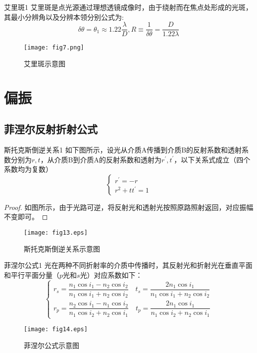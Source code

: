 \begin{myprop}{艾里斑}{1}
	艾里斑是点光源通过理想透镜成像时，由于绕射而在焦点处形成的光斑，其最小分辨角以及分辨本领分别公式为:
	\[
		\delta \theta=\theta_1 \approx 1.22 \frac{\lambda}{D},R \equiv \frac{1}{\delta \theta}=\frac{D}{1.22 \lambda}
	\]
\end{myprop}
\begin{figure}[!htp]
	\centering
	\texttt{[image: fig7.png]}
	\caption{艾里斑示意图}
\end{figure}








\section{偏振}

\subsection{菲涅尔反射折射公式}

\begin{myprop}{斯托克斯倒逆关系}{1}
如下图所示，设光从介质A传播到介质B的反射系数和透射系数分别为$r,t$，从介质B到介质A的反射系数和透射为$r^{\prime},t^{\prime}$，以下关系式成立（四个系数均为复数）
	\[
		\left\{\begin{array}{l}r^{\prime}=-r \\ r^2+t t^{\prime}=1\end{array}\right.
	\]
\end{myprop}
\begin{proof}
	如图所示，由于光路可逆，将反射光和透射光按照原路照射返回，对应振幅不变即可。
\end{proof}
\begin{figure}[!htp]
	\centering
	\texttt{[image: fig13.eps]}
	\caption{斯托克斯倒逆关系示意图}
\end{figure}

\begin{myprop}{菲涅尔公式}{1}
	光在两种不同折射率的介质中传播时，其反射光和折射光在垂直平面和平行平面分量（$p$光和$s$光）对应系数如下：
		\[
			\left\{\begin{array}{l}
				r_s=\dfrac{n_1 \cos i_1-n_2 \cos i_2}{n_1 \cos i_1+n_2 \cos i_2} \quad t_s=\dfrac{2 n_1 \cos i_1}{n_1 \cos i_1+n_2 \cos i_2} \\
				r_p=\dfrac{n_2 \cos i_1-n_1 \cos i_2}{n_1 \cos i_2+n_2 \cos i_1} \quad t_p=\dfrac{2 n_1 \cos i_1}{n_1 \cos i_2+n_2 \cos i_1}
				\end{array}\right.
		\]
\end{myprop}
\begin{figure}[!htp]
	\centering
	\texttt{[image: fig14.eps]}
	\caption{菲涅尔公式示意图}
\end{figure}

